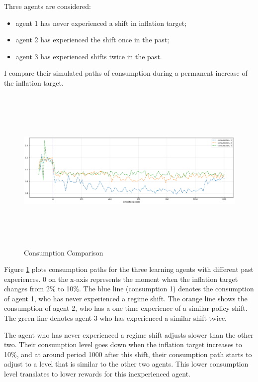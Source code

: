 \documentclass[hidelinks]{article}
\begin{document}
Three agents are considered: 
\begin{itemize}
    \item agent 1 has never experienced a shift in inflation target; 
    \item agent 2 has experienced the shift once in the past; 
    \item agent 3 has experienced shifts twice in the past. 
\end{itemize}

I compare their simulated paths of consumption during a permanent increase of the inflation target.



  \begin{figure}[H]
	\caption{Consumption Comparison}
	\centerline{\includegraphics[width=19cm,height=8cm]{consumption_3exp.png}}
	\label{r_mchange}
\end{figure}

Figure \ref{r_mchange} plots consumption paths for the three learning agents with different past experiences. 0 on the x-axis represents the moment when the inflation target changes from 2\% to 10\%. The blue line (consumption 1) denotes the consumption of agent 1, who has never experienced a regime shift. The orange line shows the consumption of agent 2, who has a one time experience of a similar policy shift. The green line denotes agent 3 who has experienced a similar shift twice. 

The agent who has never experienced a regime shift adjusts slower than the other two. Their consumption level goes down when the inflation target increases to 10\%,  and at around period 1000 after this shift, their consumption path starts to adjust to a level that is similar to the other two agents. This lower consumption level translates to lower rewards for this inexperienced agent. 
\end{document}
